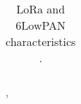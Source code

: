 \begin{table}
\begin{tabular}{l|l|l|l}
\end{tabular}
\caption{LoRa and 6LowPAN characteristics \cite{lopes_design_2019}.}
\end{table}


\cite{raza_low_22}
\cite{al-kashoash_comparison_2016}, 


